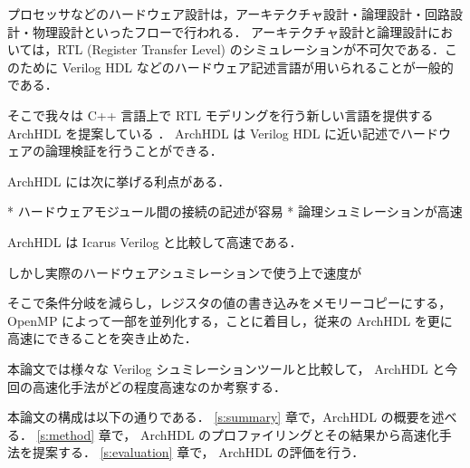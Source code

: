 プロセッサなどのハードウェア設計は，アーキテクチャ設計・論理設計・回路設計・物理設計といったフローで行われる．
アーキテクチャ設計と論理設計においては，RTL (Register Transfer Level)
のシミュレーションが不可欠である．このために
Verilog HDL などのハードウェア記述言語が用いられることが一般的である．

そこで我々は C++ 言語上で RTL モデリングを行う新しい言語を提供する ArchHDL を提案している \cite{satos:archhdl}．
ArchHDL は Verilog HDL に近い記述でハードウェアの論理検証を行うことができる．

ArchHDL には次に挙げる利点がある．

* ハードウェアモジュール間の接続の記述が容易
* 論理シュミレーションが高速

ArchHDL は Icarus Verilog と比較して高速である．

しかし実際のハードウェアシュミレーションで使う上で速度が

そこで条件分岐を減らし，レジスタの値の書き込みをメモリーコピーにする，OpenMP によって一部を並列化する，ことに着目し，従来の ArchHDL を更に高速にできることを突き止めた．

本論文では様々な Verilog シュミレーションツールと比較して， ArchHDL と今回の高速化手法がどの程度高速なのか考察する．


本論文の構成は以下の通りである． \ref{s:summary} 章で，ArchHDL の概要を述べる．
\ref{s:method} 章で， ArchHDL のプロファイリングとその結果から高速化手法を提案する．
\ref{s:evaluation} 章で， ArchHDL の評価を行う．


